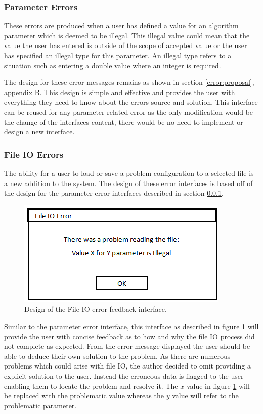 \subsubsection{Parameter Errors}
\label{paramerror}
These errors are produced when a user has defined a value for an algorithm parameter which is deemed to be illegal. This illegal value could mean that the value the user has entered is outside of the scope of accepted value or the user has specified an illegal type for this parameter. An illegal type refers to a situation such as entering a double value where an integer is required.

The design for these error messages remains as shown in section \ref{error:proposal}, appendix B. This design is simple and effective and provides the user with everything they need to know about the errors source and solution. This interface can be reused for any parameter related error as the only modification would be the change of the interfaces content, there would be no need to implement or design a new interface.

\subsubsection{File IO Errors}

The ability for a user to load or save a problem configuration to a selected file is a new addition to the system. The design of these error interfaces is based off of the design for the parameter error interfaces described in section \ref{paramerror}. 

\begin{figure}[H]
\centering
\includegraphics[scale=0.7]{Images/chapter4/IOError}
\caption[File IO Error Feedback Design]{Design of the File IO error feedback interface.}
\label{fig:ioErrors}
\end{figure}

Similar to the parameter error interface, this interface as described in figure \ref{fig:ioErrors} will provide the user with concise feedback as to how and why the file IO process did not complete as expected. From the error message displayed the user should be able to deduce their own solution to the problem. As there are numerous problems which could arise with file IO, the author decided to omit providing a explicit solution to the user. Instead the erroneous data is flagged to the user enabling them to locate the problem and resolve it. The $x$ value in figure \ref{fig:ioErrors} will be replaced with the problematic value whereas the $y$ value will refer to the problematic parameter.

